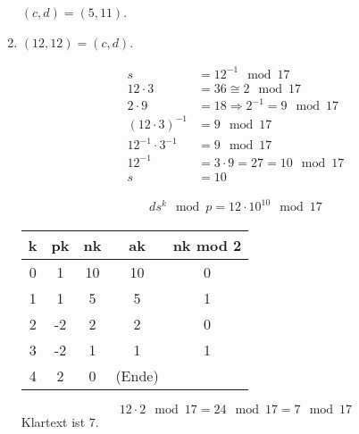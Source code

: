 \begin{enumerate}[label=\alph*)]
$(c, d) = (5, 11)$.
\item $(12,12) = (c,d)$.

\begin{align*}
s &= 12^{-1} \mod 17 \\
12\cdot 3 &= 36 \cong 2 \mod 17 \\
2\cdot 9 &= 18 \Rightarrow 2^{-1} = 9 \mod 17 \\
(12\cdot3)^{-1} &= 9 \mod 17 \\
12^{-1} \cdot 3^{-1} &= 9 \mod 17 \\
12^{-1} &= 3 \cdot 9 = 27 = 10 \mod 17 \\
s &= 10
\end{align*}

\begin{align*}
ds^{k} \mod p = 12 \cdot 10^{10} \mod 17
\end{align*}

\begin{tabular}{c|c|c|c|c}
k & pk & nk & ak & nk mod 2 \\
\hline
0 & 1 & 10 & 10 & 0 \\
1 & 1 & 5 & 5 & 1 \\
2 & -2 & 2 & 2 & 0 \\
3 & -2 & 1 & 1 & 1 \\
4 & 2 & 0 & (Ende)
\end{tabular}

\[
12\cdot 2 \mod 17 = 24 \mod 17 = 7 \mod 17
\]
Klartext ist $7$.

\end{enumerate}



























